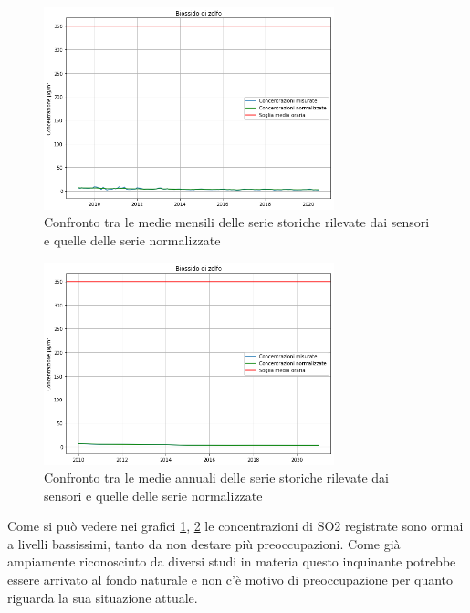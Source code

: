 \documentclass[a4paper]{report}
\begin{document}
\begin{figure}[h]
\centering
\includegraphics[width=0.75\textwidth]{so2_medie_mensili}
\caption{Confronto tra le medie mensili delle serie storiche rilevate dai sensori e quelle delle serie normalizzate}
\label{fig:so2_medie_mensili}
\end{figure}

\begin{figure}[h]
\centering
\includegraphics[width=0.75\textwidth]{so2_medie_annuali}
\caption{Confronto tra le medie annuali delle serie storiche rilevate dai sensori e quelle delle serie normalizzate}
\label{fig:so2_medie_annuali}
\end{figure}

Come si può vedere nei grafici \ref{fig:so2_medie_mensili}, \ref{fig:so2_medie_annuali}
le concentrazioni di SO2 registrate sono ormai a livelli bassissimi, tanto da non destare più preoccupazioni. Come già ampiamente riconosciuto da diversi studi in materia \cite{iir2020, scolari2017evoluzione}
 questo inquinante potrebbe essere arrivato al fondo naturale e non c'è motivo di preoccupazione per quanto riguarda la sua situazione attuale.
 
\end{document}
